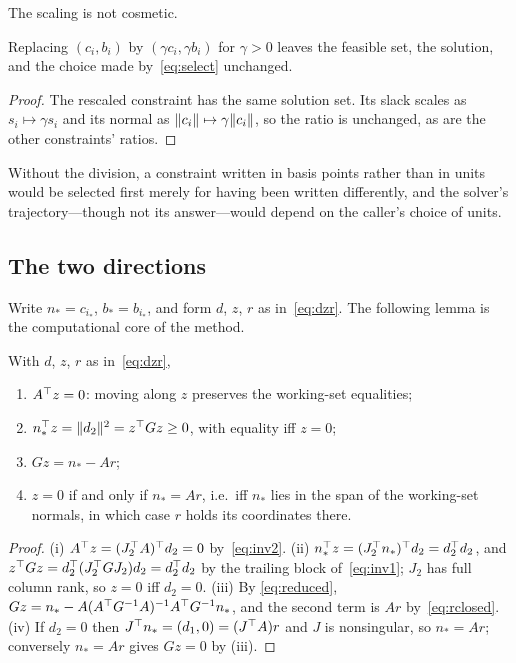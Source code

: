 The scaling is not cosmetic.

\begin{proposition}
\label{prop:scale}
Replacing $(c_i,b_i)$ by $(\gamma c_i, \gamma b_i)$ for $\gamma > 0$ leaves the
feasible set, the solution, and the choice made by~\eqref{eq:select} unchanged.
\end{proposition}

\begin{proof}
The rescaled constraint has the same solution set. Its slack scales as
$s_i \mapsto \gamma s_i$ and its normal as $\lVert c_i \rVert\mapsto\gamma\lVert c_i \rVert$, so
the ratio is unchanged, as are the other constraints' ratios.
\end{proof}

Without the division, a constraint written in basis points rather than in units
would be selected first merely for having been written differently, and the
solver's trajectory---though not its answer---would depend on the caller's choice
of units.

\subsection{The two directions}

Write $n_* = c_{i_*}$, $b_* = b_{i_*}$, and form $d$, $z$, $r$ as
in~\eqref{eq:dzr}. The following lemma is the computational core of the method.

\begin{lemma}
\label{lem:directions}
With $d$, $z$, $r$ as in~\eqref{eq:dzr},
\begin{enumerate}
  \item[(i)] $A^{\top} z = 0$: moving along $z$ preserves the working-set equalities;
  \item[(ii)] $n_*^{\top} z = \lVert d_2 \rVert^2 = z^{\top} G z \ge 0$, with equality iff $z = 0$;
  \item[(iii)] $G z = n_* - A r$;
  \item[(iv)] $z = 0$ if and only if $n_* = A r$, i.e.\ iff $n_*$ lies in the span
        of the working-set normals, in which case $r$ holds its coordinates there.
\end{enumerate}
\end{lemma}

\begin{proof}
(i) $A^{\top} z = (J_2^{\top} A)^{\top} d_2 = 0$ by~\eqref{eq:inv2}. (ii)
$n_*^{\top} z = (J_2^{\top} n_*)^{\top} d_2 = d_2^{\top} d_2$, and
$z^{\top} G z = d_2^{\top}(J_2^{\top} G J_2)d_2 = d_2^{\top} d_2$ by the trailing block
of~\eqref{eq:inv1}; $J_2$ has full column rank, so $z = 0$ iff $d_2 = 0$. (iii) By
\eqref{eq:reduced}, $Gz = n_* - A(A^{\top} G^{-1}A)^{-1}A^{\top} G^{-1}n_*$, and the second
term is $Ar$ by~\eqref{eq:rclosed}. (iv) If $d_2 = 0$ then
$J^{\top} n_* = (d_1,0) = (J^{\top} A)r$ and $J$ is nonsingular, so $n_* = Ar$; conversely
$n_* = Ar$ gives $Gz = 0$ by (iii).
\end{proof}

